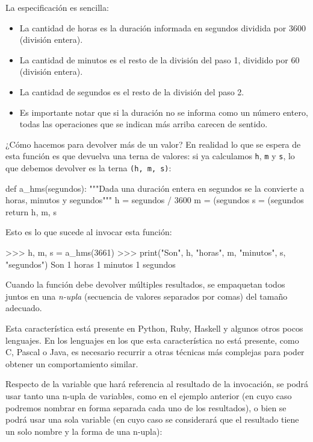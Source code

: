 \begin{solucion}
La especificación es sencilla:
\begin{itemize}
\item La cantidad de horas es la duración informada en segundos dividida
por 3600 (división entera).
\item La cantidad de minutos es el resto de la división del paso 1,
dividido por 60 (división entera).
\item La cantidad de segundos es el resto de la división del paso 2.
\item Es importante notar que si la duración no se informa como un número
entero, todas las operaciones que se indican más arriba carecen de sentido.
\end{itemize}

¿Cómo hacemos para devolver más de un valor? En realidad lo que se espera
de esta función es que devuelva una terna de valores: si ya calculamos
\lstinline!h!, \lstinline!m! y \lstinline!s!, lo que debemos devolver
es la terna \lstinline+(h, m, s)+:

\begin{codigo-python-sn}
def a_hms(segundos):
   """Dada una duración entera en segundos
      se la convierte a horas, minutos y segundos"""
   h = segundos / 3600
   m = (segundos %
   s = (segundos %
   return h, m, s
\end{codigo-python-sn}
\end{solucion}

Esto es lo que sucede al invocar esta función:

\begin{codigo-python-sn}
>>> h, m, s = a_hms(3661)
>>> print("Son", h, "horas", m, "minutos", s, "segundos")
Son 1 horas 1 minutos 1 segundos
\end{codigo-python-sn}

\begin{sabias_que}
Cuando la función debe devolver múltiples resultados, se empaquetan todos juntos
en una {\it n-upla} (secuencia de valores separados por comas) del tamaño adecuado.

Esta característica está presente en Python, Ruby, Haskell y algunos otros pocos
lenguajes.  En los lenguajes en los que esta característica no está
presente, como C, Pascal o Java, es necesario recurrir a otras
técnicas más complejas para poder obtener un comportamiento similar.
\end{sabias_que}

Respecto de la variable que hará referencia al resultado de la invocación,
se podrá usar tanto una n-upla de variables, como en el ejemplo anterior
(en cuyo caso podremos nombrar en forma separada cada uno de los resultados),
o bien se podrá usar una sola variable (en cuyo caso se considerará que
el resultado tiene un solo nombre y la forma de una n-upla):

